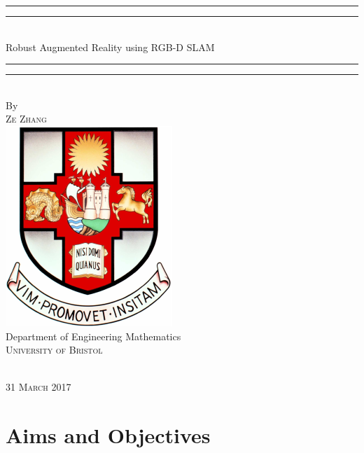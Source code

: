 \documentclass[a4paper,11pt]{article}
\begin{document}
\vspace*{13mm}
\begin{center}
\rule[0.5ex]{\linewidth}{2pt}\vspace*{-\baselineskip}\vspace*{3.2pt}
\rule[0.5ex]{\linewidth}{1pt}\\[\baselineskip]
{\Huge Robust Augmented Reality using RGB-D SLAM}\\[4mm]

\rule[0.5ex]{\linewidth}{1pt}\vspace*{-\baselineskip}\vspace{3.2pt}
\rule[0.5ex]{\linewidth}{2pt}\\
\vspace{6.5mm}
{\large By}\\
\vspace{6.5mm}
{\large\textsc{Ze Zhang}}\\
\vspace{11mm}
\includegraphics[scale=0.6]{bristolcrest_colour}\\
\vspace{6mm}
{\large Department of Engineering Mathematics\\
\textsc{University of Bristol}}\\
\vspace{11mm}
\begin{minipage}{10cm}

\end{minipage}\\
\vspace{9mm}
{\large\textsc{31 March 2017}}
\vspace{12mm}
\end{center}

\newpage
\section{Aims and Objectives}
\end{document}
